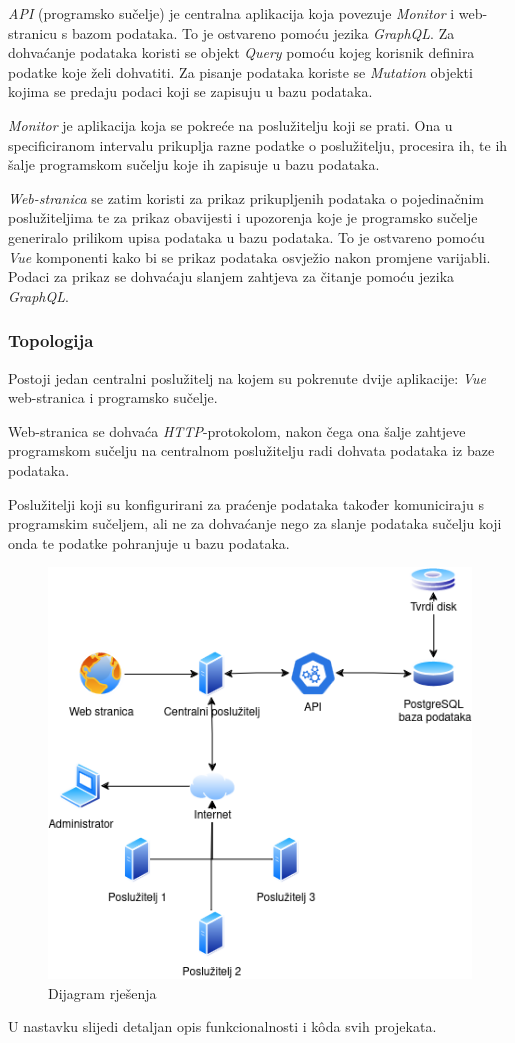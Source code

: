 \documentclass[zavrsnirad]{fer}
\begin{document}
\textit{API} (programsko sučelje) je centralna aplikacija koja povezuje \textit{Monitor} i web-stranicu s bazom podataka. To je ostvareno pomoću jezika \textit{GraphQL}. Za dohvaćanje podataka koristi se objekt \textit{Query} pomoću kojeg korisnik definira podatke koje želi dohvatiti. Za pisanje podataka koriste se \textit{Mutation} objekti kojima se predaju podaci koji se zapisuju u bazu podataka.

\textit{Monitor} je aplikacija koja se pokreće na poslužitelju koji se prati. Ona u specificiranom intervalu prikuplja razne podatke o poslužitelju, procesira ih, te ih šalje programskom sučelju koje ih zapisuje u bazu podataka.

\textit{Web-stranica} se zatim koristi za prikaz prikupljenih podataka o pojedinačnim poslužiteljima te za prikaz obavijesti i upozorenja koje je programsko sučelje generiralo prilikom upisa podataka u bazu podataka. To je ostvareno pomoću \textit{Vue} komponenti kako bi se prikaz podataka osvježio nakon promjene varijabli. Podaci za prikaz se dohvaćaju slanjem zahtjeva za čitanje pomoću jezika \textit{GraphQL}.

\subsubsection{Topologija}
Postoji jedan centralni poslužitelj na kojem su pokrenute dvije aplikacije: \textit{Vue} web-stranica i programsko sučelje.

Web-stranica se dohvaća \textit{HTTP}-protokolom, nakon čega ona šalje zahtjeve programskom sučelju na centralnom poslužitelju radi dohvata podataka iz baze podataka.

Poslužitelji koji su konfigurirani za praćenje podataka također komuniciraju s programskim sučeljem, ali ne za dohvaćanje nego za slanje podataka sučelju koji onda te podatke pohranjuje u bazu podataka.
\begin{figure}[htb!]
	\centering
	\includegraphics[width=0.6\linewidth]{images/flowchart.png} 
	\caption{Dijagram rješenja}
	\label{slk:flowchart}
\end{figure}
\FloatBarrier
U nastavku slijedi detaljan opis funkcionalnosti i kôda svih projekata.
\end{document}
